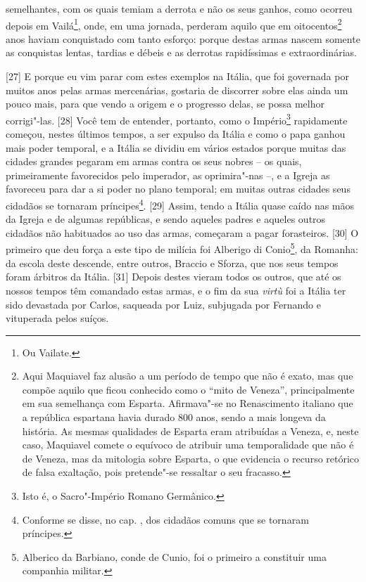 semelhantes, com os quais temiam a derrota e não os seus ganhos, como
ocorreu depois em Vailá\footnote{Ou Vailate.}, onde, em uma jornada,
perderam aquilo que em oitocentos\footnote{Aqui Maquiavel faz alusão a
  um período de tempo que não é exato, mas que compõe aquilo que ficou
  conhecido como o ``mito de Veneza'', principalmente em sua semelhança
  com Esparta. Afirmava"-se no Renascimento italiano que a república
  espartana havia durado 800 anos, sendo a mais longeva da história. As
  mesmas qualidades de Esparta eram atribuídas a Veneza, e, neste caso,
  Maquiavel comete o equívoco de atribuir uma temporalidade que não é de
  Veneza, mas da mitologia sobre Esparta, o que evidencia o recurso
  retórico de falsa exaltação, pois pretende"-se ressaltar o seu
  fracasso.} anos haviam conquistado com tanto esforço: porque destas
armas nascem somente as conquistas lentas, tardias e débeis e as
derrotas rapidíssimas e extraordinárias.

{[}27{]} E porque eu vim parar com estes exemplos na Itália, que foi
governada por muitos anos pelas armas mercenárias, gostaria de discorrer
sobre elas ainda um pouco mais, para que vendo a origem e o progresso
delas, se possa melhor corrigi"-las. {[}28{]} Você tem de entender,
portanto, como o Império\footnote{Isto é, o Sacro"-Império Romano
  Germânico.} rapidamente começou, nestes últimos tempos, a ser expulso
da Itália e como o papa ganhou mais poder temporal, e a Itália se
dividiu em vários estados porque muitas das cidades grandes pegaram em
armas contra os seus nobres -- os quais, primeiramente favorecidos pelo
imperador, as oprimira"-nas --, e a Igreja as favoreceu para dar a si
poder no plano temporal; em muitas outras cidades seus cidadãos se
tornaram príncipes\footnote{Conforme se disse, no cap. , dos cidadãos
  comuns que se tornaram príncipes.}. {[}29{]} Assim, tendo a Itália
quase caído nas mãos da Igreja e de algumas repúblicas, e sendo aqueles
padres e aqueles outros cidadãos não habituados ao uso das armas,
começaram a pagar forasteiros. {[}30{]} O primeiro que deu força a este
tipo de milícia foi Alberigo di Conio\footnote{Alberico da Barbiano,
  conde de Cunio, foi o primeiro a constituir uma companhia militar.},
da Romanha: da escola deste descende, entre outros, Braccio e Sforza,
que nos seus tempos foram árbitros da Itália. {[}31{]} Depois destes
vieram todos os outros, que até os nossos tempos têm comandado estas
armas, e o fim da sua \emph{virtù} foi a Itália ter sido devastada por
Carlos, saqueada por Luiz, subjugada por Fernando e vituperada pelos
suíços.

